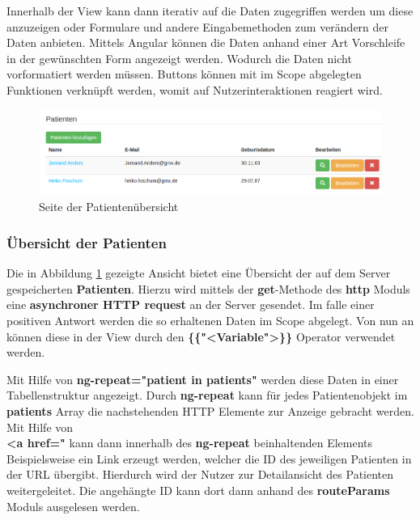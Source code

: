Innerhalb der View kann dann iterativ auf die Daten zugegriffen werden um diese anzuzeigen oder Formulare und andere Eingabemethoden zum verändern der Daten anbieten.
Mittels Angular können die Daten anhand einer Art Vorschleife in der gewünschten Form angezeigt werden. Wodurch die Daten nicht vorformatiert werden müssen.
Buttons können mit im Scope abgelegten Funktionen verknüpft werden, womit auf Nutzerinteraktionen reagiert wird.
\begin{figure}[H]
	\centering
	\includegraphics[scale=0.4]{images/Screenshots/PatientenUebersicht}
	\caption[Seite der Patientenübersicht]{Seite der Patientenübersicht}
	\label{PatientenUebersicht}
\end{figure}

\subsubsection{Übersicht der Patienten}\label{_ImpTCPatientUebersicht}
Die in Abbildung \ref{PatientenUebersicht} gezeigte Ansicht bietet eine Übersicht der auf dem Server gespeicherten \textbf{Patienten}. Hierzu wird mittels der \textbf{get}-Methode des \textbf{http} Moduls eine \textbf{asynchroner HTTP request} an der Server gesendet. Im falle einer positiven Antwort werden die so erhaltenen Daten im Scope abgelegt. Von nun an können diese in der View durch den \textbf{\{\{"<Variable">\}\}} Operator verwendet werden.

Mit Hilfe von \textbf{ng-repeat="patient in patients"} werden diese Daten in einer Tabellenstruktur angezeigt. Durch \textbf{ng-repeat} kann für jedes Patientenobjekt im \textbf{patients} Array die nachstehenden HTTP Elemente zur Anzeige gebracht werden. Mit Hilfe von \\ \textbf{<a href=" } kann dann innerhalb des \textbf{ng-repeat} beinhaltenden Elements Beispielsweise ein Link erzeugt werden, welcher die ID des jeweiligen Patienten in der URL übergibt. Hierdurch wird der Nutzer zur Detailansicht des Patienten weitergeleitet. Die angehängte ID kann dort dann anhand des \textbf{routeParams} Moduls ausgelesen werden. 

